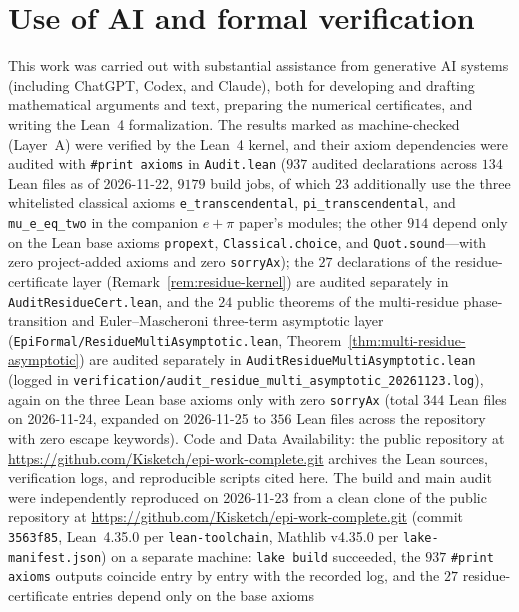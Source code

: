 \section*{Use of AI and formal verification}
This work was carried out with substantial assistance from generative AI
systems (including ChatGPT, Codex, and Claude), both for developing and drafting
mathematical arguments and text, preparing the numerical certificates, and
writing the Lean~4 formalization. The results marked as machine-checked (Layer~A)
were verified by the Lean~4 kernel, and their axiom dependencies were audited
with \texttt{\#print axioms} in \texttt{Audit.lean} ($937$ audited declarations
across $134$ Lean files as of 2026-11-22, $9179$ build jobs, of which $23$ additionally use the three whitelisted classical
axioms \texttt{e\_transcendental}, \texttt{pi\_transcendental}, and
\texttt{mu\_e\_eq\_two} in the companion $e+\pi$ paper's modules; the other $914$
depend only on the Lean base axioms \texttt{propext}, \texttt{Classical.choice},
and \texttt{Quot.sound}---with zero
project-added axioms and zero \texttt{sorryAx}); the $27$ declarations of the
residue-certificate layer (Remark~\ref{rem:residue-kernel}) are audited separately in
\texttt{AuditResidueCert.lean}, and the $24$ public theorems of the multi-residue
phase-transition and Euler--Mascheroni three-term asymptotic layer
(\texttt{EpiFormal/\allowbreak ResidueMultiAsymptotic.lean},
Theorem~\ref{thm:multi-residue-asymptotic}) are audited separately in
\texttt{AuditResidueMultiAsymptotic.lean} (logged in
\texttt{verification/\allowbreak audit\_\allowbreak residue\_\allowbreak multi\_\allowbreak asymptotic\_\allowbreak 20261123.log}),
again on the three Lean base axioms only with zero \texttt{sorryAx} (total $344$ Lean files on 2026-11-24, expanded on 2026-11-25 to $356$ Lean files across the repository with zero escape keywords). Code and Data Availability: the public repository at \url{https://github.com/Kisketch/epi-work-complete.git} archives the Lean sources, verification logs, and reproducible scripts cited here. The build and main audit were independently reproduced on 2026-11-23 from a clean clone of the public repository at \url{https://github.com/Kisketch/epi-work-complete.git} (commit \texttt{3563f85}, Lean~4.35.0 per \texttt{lean-toolchain}, Mathlib v4.35.0 per \texttt{lake-manifest.json}) on a separate machine: \texttt{lake build} succeeded, the $937$
\texttt{\#print axioms} outputs coincide entry by entry with the recorded log, and the $27$ residue-certificate entries depend only on the base axioms

